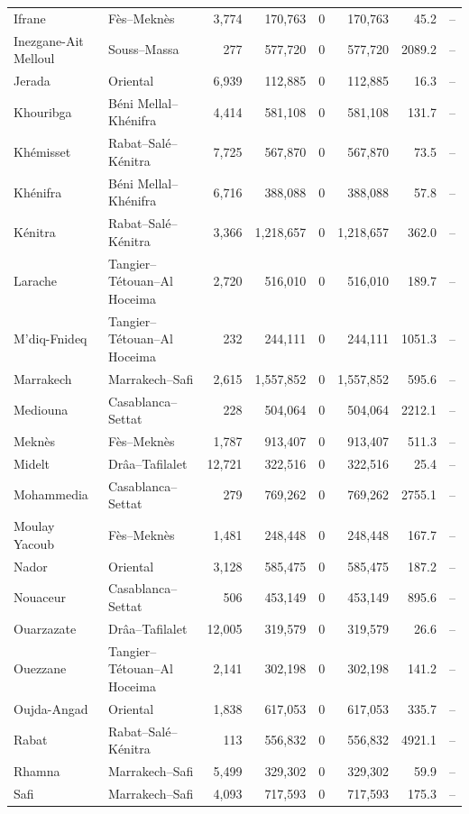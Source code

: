 \documentclass[10pt]{article}
\begin{document}
\begin{longtable}{@{}>{\raggedright\arraybackslash}p{3.0cm}>{\raggedright\arraybackslash}p{3.6cm}rrrrrl@{}}
Ifrane & Fès--Meknès & 3,774 & 170,763 & 0 & 170,763 & 45.2 & -- \\
Inezgane-Ait Melloul & Souss--Massa & 277 & 577,720 & 0 & 577,720 & 2089.2 & -- \\
Jerada & Oriental & 6,939 & 112,885 & 0 & 112,885 & 16.3 & -- \\
Khouribga & Béni Mellal--Khénifra & 4,414 & 581,108 & 0 & 581,108 & 131.7 & -- \\
Khémisset & Rabat--Salé--Kénitra & 7,725 & 567,870 & 0 & 567,870 & 73.5 & -- \\
Khénifra & Béni Mellal--Khénifra & 6,716 & 388,088 & 0 & 388,088 & 57.8 & -- \\
Kénitra & Rabat--Salé--Kénitra & 3,366 & 1,218,657 & 0 & 1,218,657 & 362.0 & -- \\
Larache & Tangier--Tétouan--Al Hoceima & 2,720 & 516,010 & 0 & 516,010 & 189.7 & -- \\
M'diq-Fnideq & Tangier--Tétouan--Al Hoceima & 232 & 244,111 & 0 & 244,111 & 1051.3 & -- \\
Marrakech & Marrakech--Safi & 2,615 & 1,557,852 & 0 & 1,557,852 & 595.6 & -- \\
Mediouna & Casablanca--Settat & 228 & 504,064 & 0 & 504,064 & 2212.1 & -- \\
Meknès & Fès--Meknès & 1,787 & 913,407 & 0 & 913,407 & 511.3 & -- \\
Midelt & Drâa--Tafilalet & 12,721 & 322,516 & 0 & 322,516 & 25.4 & -- \\
Mohammedia & Casablanca--Settat & 279 & 769,262 & 0 & 769,262 & 2755.1 & -- \\
Moulay Yacoub & Fès--Meknès & 1,481 & 248,448 & 0 & 248,448 & 167.7 & -- \\
Nador & Oriental & 3,128 & 585,475 & 0 & 585,475 & 187.2 & -- \\
Nouaceur & Casablanca--Settat & 506 & 453,149 & 0 & 453,149 & 895.6 & -- \\
Ouarzazate & Drâa--Tafilalet & 12,005 & 319,579 & 0 & 319,579 & 26.6 & -- \\
Ouezzane & Tangier--Tétouan--Al Hoceima & 2,141 & 302,198 & 0 & 302,198 & 141.2 & -- \\
Oujda-Angad & Oriental & 1,838 & 617,053 & 0 & 617,053 & 335.7 & -- \\
Rabat & Rabat--Salé--Kénitra & 113 & 556,832 & 0 & 556,832 & 4921.1 & -- \\
Rhamna & Marrakech--Safi & 5,499 & 329,302 & 0 & 329,302 & 59.9 & -- \\
Safi & Marrakech--Safi & 4,093 & 717,593 & 0 & 717,593 & 175.3 & -- \\

\end{longtable}
\end{document}
